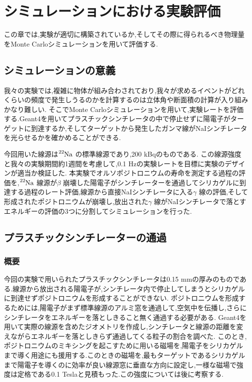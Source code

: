 \chapter{シミュレーションにおける実験評価}\label{simulation}

この章では,実験が適切に構築されているか,そしてその際に得られるべき物理量をMonte Carloシミュレーションを用いて評価する.


\section{シミュレーションの意義}

我々の実験では,複雑に物体が組み合わされており,我々が求めるイベントがどれくらいの頻度で発生しうるのかを計算するのは立体角や断面積の計算が入り組みかなり難しい.
そこでMonte Carloシミュレーションを用いて,実験レートを評価する.Geant4を用いてプラスチックシンチレータの中で停止せずに陽電子がターゲットに到達するか,そしてターゲットから発生したガンマ線がNaIシンチレータを光らせるかを確かめることができる.

今回用いた線源は$\ce{^{22}Na}$ の標準線源であり,200 kBqのものである.
この線源強度と我々の実験期間約1週間を考慮して,0.1 Hzの実験レートを目標に実験のデザインが適当か検証した.
本実験でオルソポジトロニウムの寿命を測定する過程の評価を,$\ce{^{22}Na}$ 線源が$\beta$ 崩壊した陽電子がシンチレーターを通過してシリカゲルに到達する過程のレート評価,線源から直接NaIシンチレータに入る$\gamma$ 線の評価,そして形成されたポジトロニウムが崩壊し,放出された$\gamma$ 線がNaIシンチレータで落とすエネルギーの評価の3つに分割してシミュレーションを行った.



\section{プラスチックシンチレーターの通過}

\subsection{概要}
今回の実験で用いられたプラスチックシンチレータは0.15 mmの厚みのものである.線源から放出される陽電子が,シンチレータ内で停止してしまうとシリカゲルに到達せずポジトロニウムを形成することができない.
ポジトロニウムを形成するためには,陽電子がまず標準線源のアルミ窓を通過して,空気中を伝播し,さらにシンチレータをエネルギーを落としきること無く通過する必要がある.
Geant4を用いて実際の線源を含めたジオメトリを作成し,シンチレータと線源の距離を変えながらエネルギーを落としきらず通過してくる粒子の割合を調べた.
このとき,ポジトロニウムのミキシングを起こすために用いる磁場を,陽電子をシリカゲルまで導く用途にも援用する.このときの磁場を,最もターゲットであるシリカゲルまで陽電子を導くのに効率が良い線源窓に垂直な方向に設定し,一様な磁場で強度は定格である0.1 Teslaと見積もった.この強度については後に考察する.

